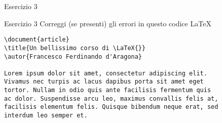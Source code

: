 \begin{frame}[fragile]{Esercizio 3}

\begin{esercizio}{Esercizio 3}
	Correggi (se presenti) gli errori in questo codice \LaTeX{}
	\begin{code}
\begin{verbatim}
\document{article}
\title{Un bellissimo corso di \LaTeX{}}
\autor{Francesco Ferdinando d'Aragona}

Lorem ipsum dolor sit amet, consectetur adipiscing elit. 
Vivamus nec turpis ac lacus dapibus porta sit amet eget 
tortor. Nullam in odio quis ante facilisis fermentum quis 
ac dolor. Suspendisse arcu leo, maximus convallis felis at,
facilisis elementum felis. Quisque bibendum neque erat, sed 
interdum leo semper et.
	\end{verbatim}
	\end{code}
\end{esercizio}

\end{frame}